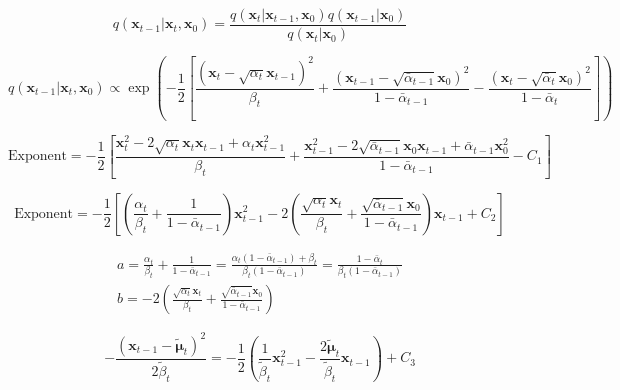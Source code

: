\documentclass[a4paper, 11pt]{article}
\begin{document}
\begin{equation*}
    q(\mathbf{x}_{t-1}|\mathbf{x}_t, \mathbf{x}_0) = \frac{q(\mathbf{x}_t|\mathbf{x}_{t-1},\mathbf{x}_0)q(\mathbf{x}_{t-1}|\mathbf{x}_0)}{q(\mathbf{x}_t|\mathbf{x}_0)}
\end{equation*}

\begin{equation*}
    q(\mathbf{x}_{t-1}|\mathbf{x}_t, \mathbf{x}_0) \propto \exp \left( -\frac{1}{2} \left[ \frac{(\mathbf{x}_t - \sqrt{\alpha_t}\mathbf{x}_{t-1})^2}{\beta_t} + \frac{(\mathbf{x}_{t-1} - \sqrt{\bar{\alpha}_{t-1}}\mathbf{x}_0)^2}{1 - \bar{\alpha}_{t-1}} - \frac{(\mathbf{x}_t - \sqrt{\bar{\alpha}_t}\mathbf{x}_0)^2}{1 - \bar{\alpha}_t} \right] \right)
\end{equation*}

\begin{equation*}
    \text{Exponent} = -\frac{1}{2} \left[ \frac{\mathbf{x}_t^2 - 2\sqrt{\alpha_t}\mathbf{x}_t\mathbf{x}_{t-1} + \alpha_t\mathbf{x}_{t-1}^2}{\beta_t} + \frac{\mathbf{x}_{t-1}^2 - 2\sqrt{\bar{\alpha}_{t-1}}\mathbf{x}_0\mathbf{x}_{t-1} + \bar{\alpha}_{t-1}\mathbf{x}_0^2}{1 - \bar{\alpha}_{t-1}} - C_1 \right]
\end{equation*}

\begin{equation*}
    \text{Exponent} = -\frac{1}{2} \left[ \left( \frac{\alpha_t}{\beta_t} + \frac{1}{1 - \bar{\alpha}_{t-1}} \right)\mathbf{x}_{t-1}^2 - 2\left( \frac{\sqrt{\alpha_t}\mathbf{x}_t}{\beta_t} + \frac{\sqrt{\bar{\alpha}_{t-1}}\mathbf{x}_0}{1 - \bar{\alpha}_{t-1}} \right)\mathbf{x}_{t-1} + C_2 \right]
\end{equation*}

\begin{gather*}
    a = \frac{\alpha_t}{\beta_t} + \frac{1}{1 - \bar{\alpha}_{t-1}} = \frac{\alpha_t(1 - \bar{\alpha}_{t-1}) + \beta_t}{\beta_t(1 - \bar{\alpha}_{t-1})} = \frac{1 - \bar{\alpha}_t}{\beta_t(1 - \bar{\alpha}_{t-1})} \\[12pt]
    b = -2 \left( \frac{\sqrt{\alpha_t}\mathbf{x}_t}{\beta_t} + \frac{\sqrt{\bar{\alpha}_{t-1}}\mathbf{x}_0}{1 - \bar{\alpha}_{t-1}} \right)
\end{gather*}

\begin{equation*}
    -\frac{( \mathbf{x}_{t-1} - \tilde{\boldsymbol{\mu}}_t )^2}{2\tilde{\beta}_t} = -\frac{1}{2} \left( \frac{1}{\tilde{\beta}_t}\mathbf{x}_{t-1}^2 - \frac{2\tilde{\boldsymbol{\mu}}_t}{\tilde{\beta}_t}\mathbf{x}_{t-1} \right) + C_3
\end{equation*}
\end{document}
